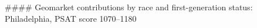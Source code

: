 #### Geomarket contributions by race and first-generation status: Philadelphia, PSAT score 1070–1180
